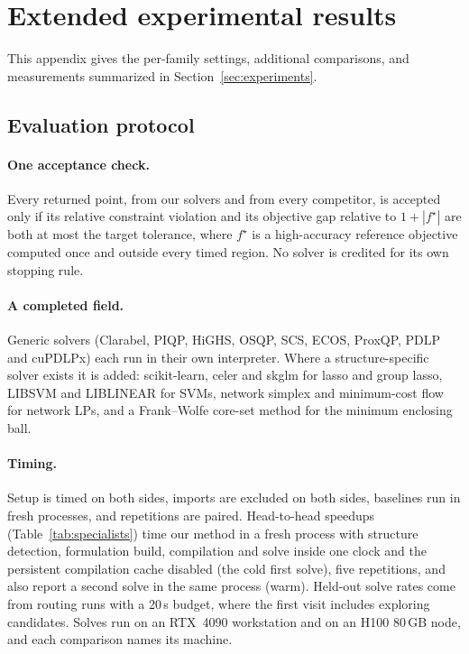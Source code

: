 \section{Extended experimental results}
\label{app:experiments}

This appendix gives the per-family settings, additional comparisons, and measurements summarized in Section~\ref{sec:experiments}.

\subsection{Evaluation protocol}

\paragraph{One acceptance check.} Every returned point, from our solvers and
from every competitor, is accepted only if its relative constraint violation and
its objective gap relative to $1 + |f^\star|$ are both at most the target
tolerance, where $f^\star$ is a high-accuracy reference objective computed once
and outside every timed region. No solver is credited for its own stopping
rule.

\paragraph{A completed field.} Generic solvers (Clarabel, PIQP, HiGHS, OSQP,
SCS, ECOS, ProxQP, PDLP and cuPDLPx) each run in their own interpreter. Where
a structure-specific solver exists it is added: scikit-learn, celer and skglm
for lasso and group lasso, LIBSVM and LIBLINEAR for SVMs, network simplex and
minimum-cost flow for network LPs, and a Frank--Wolfe core-set method for the
minimum enclosing ball.

\paragraph{Timing.} Setup is timed on both sides, imports are excluded on both
sides, baselines run in fresh processes, and repetitions are paired. Head-to-head
speedups (Table~\ref{tab:specialists}) time our method in a fresh process with
structure detection, formulation build, compilation and solve inside one clock
and the persistent compilation cache disabled (the cold first solve), five
repetitions, and also report a second solve in the same process (warm).
Held-out solve rates come from routing runs with a 20\,s budget, where the first
visit includes exploring candidates. Solves run on an RTX~4090 workstation and
on an H100 80\,GB node, and each comparison names its machine.

